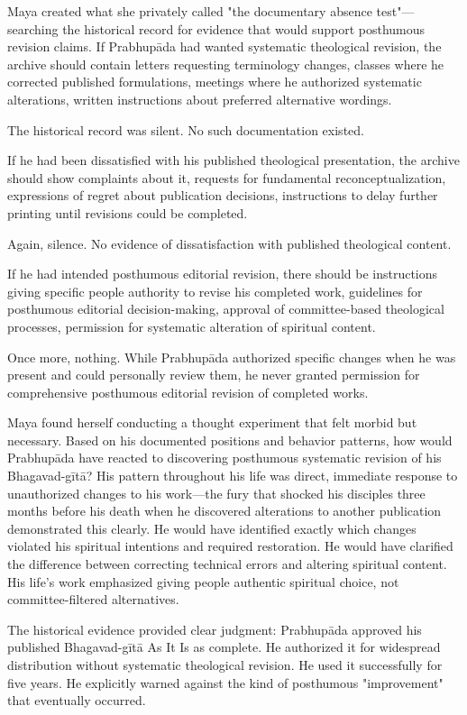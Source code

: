 \documentclass[12pt,twoside]{book}
\begin{document}
Maya created what she privately called "the documentary absence test"—searching the historical record for evidence that would support posthumous revision claims. If Prabhupāda had wanted systematic theological revision, the archive should contain letters requesting terminology changes, classes where he corrected published formulations, meetings where he authorized systematic alterations, written instructions about preferred alternative wordings.

The historical record was silent. No such documentation existed.

If he had been dissatisfied with his published theological presentation, the archive should show complaints about it, requests for fundamental reconceptualization, expressions of regret about publication decisions, instructions to delay further printing until revisions could be completed.

Again, silence. No evidence of dissatisfaction with published theological content.

If he had intended posthumous editorial revision, there should be instructions giving specific people authority to revise his completed work, guidelines for posthumous editorial decision-making, approval of committee-based theological processes, permission for systematic alteration of spiritual content.

Once more, nothing. While Prabhupāda authorized specific changes when he was present and could personally review them, he never granted permission for comprehensive posthumous editorial revision of completed works.

Maya found herself conducting a thought experiment that felt morbid but necessary. Based on his documented positions and behavior patterns, how would Prabhupāda have reacted to discovering posthumous systematic revision of his Bhagavad-gītā? His pattern throughout his life was direct, immediate response to unauthorized changes to his work—the fury that shocked his disciples three months before his death when he discovered alterations to another publication demonstrated this clearly. He would have identified exactly which changes violated his spiritual intentions and required restoration. He would have clarified the difference between correcting technical errors and altering spiritual content. His life's work emphasized giving people authentic spiritual choice, not committee-filtered alternatives.

The historical evidence provided clear judgment: Prabhupāda approved his published Bhagavad-gītā As It Is as complete. He authorized it for widespread distribution without systematic theological revision. He used it successfully for five years. He explicitly warned against the kind of posthumous "improvement" that eventually occurred.
\end{document}
